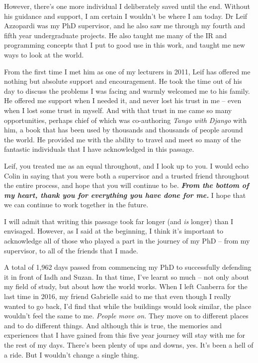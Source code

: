 \begin{preamble}
However, there's one more individual I deliberately saved until the end. Without his guidance and support, I am certain I wouldn't be where I am today. Dr Leif Azzopardi was my PhD supervisor, and he also saw me through my fourth and fifth year undergraduate projects. He also taught me many of the IR and programming concepts that I put to good use in this work, and taught me new ways to look at the world.

From the first time I met him as one of my lecturers in 2011, Leif has offered me nothing but absolute support and encouragement. He took the time out of his day to discuss the problems I was facing and warmly welcomed me to his family. He offered me support when I needed it, and never lost his trust in me -- even when I lost some trust in myself. And with that trust in me came so many opportunities, perhaps chief of which was co-authoring \emph{Tango with Django} with him, a book that has been used by thousands and thousands of people around the world. He provided me with the ability to travel and meet so many of the fantastic individuals that I have acknowledged in this passage.

Leif, you treated me as an equal throughout, and I look up to you. I would echo Colin in saying that you were both a supervisor and a trusted friend throughout the entire process, and hope that you will continue to be. \textbf{\emph{From the bottom of my heart, thank you for everything you have done for me.}} I hope that we can continue to work together in the future.

\vspace*{4mm}
\acksep

I will admit that writing this passage took far longer (and \emph{is} longer) than I envisaged. However, as I said at the beginning, I think it's important to acknowledge all of those who played a part in the journey of my PhD -- from my supervisor, to all of the friends that I made.

A total of 1,962 days passed from commencing my PhD to successfully defending it in front of Iadh and Suzan. In that time, I've learnt so much -- not only about my field of study, but about how the world works. When I left Canberra for the last time in 2016, my friend Gabrielle said to me that even though I really wanted to go back, I'd find that while the buildings would look similar, the place wouldn't feel the same to me. \emph{People move on.} They move on to different places and to do different things. And although this is true, the memories and experiences that I have gained from this five year journey will stay with me for the rest of my days. There's been plenty of ups and downs, yes. It's been a hell of a ride. But I wouldn't change a single thing.


\end{preamble}
